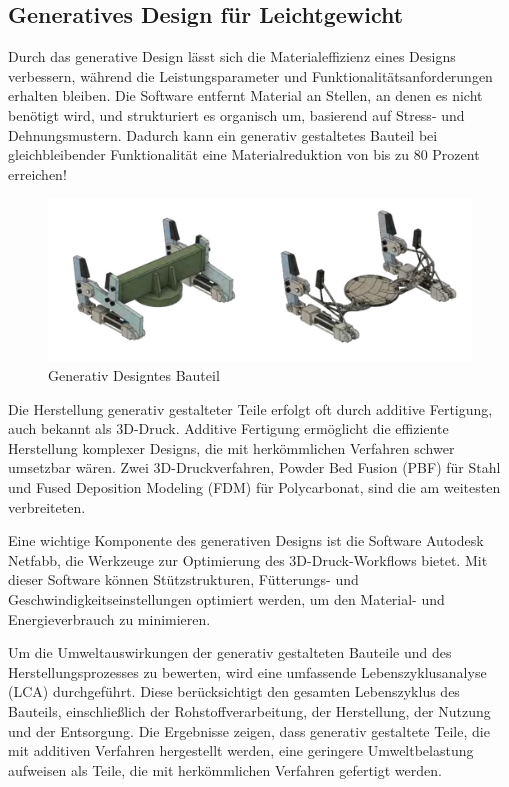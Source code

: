 \subsection*{Generatives Design für Leichtgewicht}

Durch das generative Design lässt sich die Materialeffizienz eines Designs verbessern, während die Leistungsparameter und Funktionalitätsanforderungen erhalten bleiben. Die Software entfernt Material an Stellen, an denen es nicht benötigt wird, und strukturiert es organisch um, basierend auf Stress- und Dehnungsmustern. Dadurch kann ein generativ gestaltetes Bauteil bei gleichbleibender Funktionalität eine Materialreduktion von bis zu 80 Prozent erreichen!

\begin{figure}[h]
  \begin{minipage}{0.5\textwidth}
    \centering
    \includegraphics[width=\textwidth]{./images/WhatsApp Image 2023-06-11 at 23.48.25.jpeg}
  \end{minipage}
  \caption{Generativ Designtes Bauteil}
  \label{fig:meinbild}
\end{figure}

Die Herstellung generativ gestalteter Teile erfolgt oft durch additive Fertigung, auch bekannt als 3D-Druck. Additive Fertigung ermöglicht die effiziente Herstellung komplexer Designs, die mit herkömmlichen Verfahren schwer umsetzbar wären. Zwei 3D-Druckverfahren, Powder Bed Fusion (PBF) für Stahl und Fused Deposition Modeling (FDM) für Polycarbonat, sind die am weitesten verbreiteten.

Eine wichtige Komponente des generativen Designs ist die Software Autodesk Netfabb, die Werkzeuge zur Optimierung des 3D-Druck-Workflows bietet. Mit dieser Software können Stützstrukturen, Fütterungs- und Geschwindigkeitseinstellungen optimiert werden, um den Material- und Energieverbrauch zu minimieren.

Um die Umweltauswirkungen der generativ gestalteten Bauteile und des Herstellungsprozesses zu bewerten, wird eine umfassende Lebenszyklusanalyse (LCA) durchgeführt. Diese berücksichtigt den gesamten Lebenszyklus des Bauteils, einschließlich der Rohstoffverarbeitung, der Herstellung, der Nutzung und der Entsorgung. Die Ergebnisse zeigen, dass generativ gestaltete Teile, die mit additiven Verfahren hergestellt werden, eine geringere Umweltbelastung aufweisen als Teile, die mit herkömmlichen Verfahren gefertigt werden.

